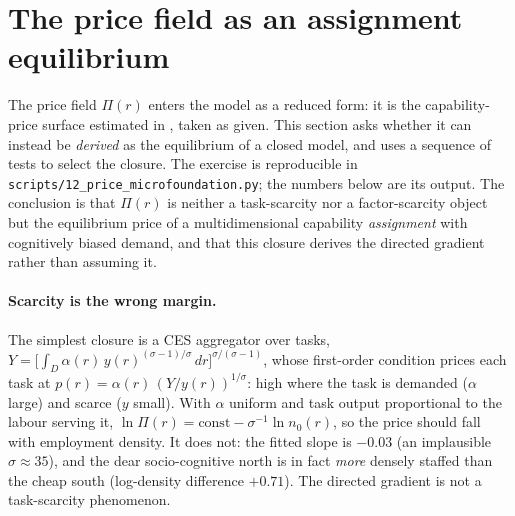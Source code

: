 \section{The price field as an assignment equilibrium}
\label{sec:microfoundation}

The price field $\Pi(r)$ enters the model as a reduced form: it is the
capability-price surface estimated in \textcite{storck2026geometry}, taken as
given. This section asks whether it can instead be \emph{derived} as the
equilibrium of a closed model, and uses a sequence of tests to select the
closure. The exercise is reproducible in \texttt{scripts/12\_price\_microfoundation.py};
the numbers below are its output. The conclusion is that $\Pi(r)$ is neither a
task-scarcity nor a factor-scarcity object but the equilibrium price of a
multidimensional capability \emph{assignment} with cognitively biased demand,
and that this closure derives the directed gradient rather than assuming it.

\paragraph{Scarcity is the wrong margin.}
The simplest closure is a CES aggregator over tasks,
$Y = \big[\int_{D} \alpha(r)\, y(r)^{(\sigma-1)/\sigma}\, dr\big]^{\sigma/(\sigma-1)}$,
whose first-order condition prices each task at
$p(r) = \alpha(r)\,(Y/y(r))^{1/\sigma}$: high where the task is demanded
($\alpha$ large) and scarce ($y$ small). With $\alpha$ uniform and task output
proportional to the labour serving it, $\ln\Pi(r) = \text{const} - \sigma^{-1}\ln
n_0(r)$, so the price should fall with employment density. It does not: the
fitted slope is $-0.03$ (an implausible $\sigma \approx 35$), and the dear
socio-cognitive north is in fact \emph{more} densely staffed than the cheap
south (log-density difference $+0.71$). The directed gradient is not a
task-scarcity phenomenon.

